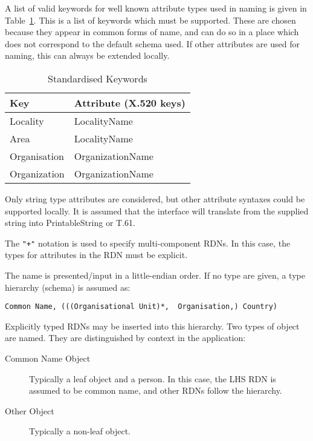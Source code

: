 A list of valid keywords for well known attribute types used in naming is
given in Table~\ref{keywords}.  This is a list of keywords which must be
supported.  These are chosen because they appear in common forms of name,
and can do so in a place which does not correspond to the default schema
used.
If other attributes are used for naming, this can always be
extended locally.

\begin{table}
\begin{center}
\begin {tabular}{l l}
Key & Attribute (X.520 keys) \\
\hline
Locality & LocalityName \\
Area & LocalityName \\
Organisation & OrganizationName \\
Organization & OrganizationName \\
\end {tabular}
\end{center}
\caption {Standardised Keywords}
\label {keywords}
\end{table}


Only string type attributes are
considered, but other attribute syntaxes could be supported locally.
It is assumed that the interface will translate from the supplied string
into PrintableString or T.61.

The \verb|"+"| notation is used to specify multi-component RDNs.  In this
case, the types for attributes in the RDN must be explicit.

The name is presented/input in a little-endian order.  If no type are given,
a type hierarchy (schema) is assumed as:

\begin {verbatim}
Common Name, (((Organisational Unit)*,  Organisation,) Country)
\end{verbatim}

Explicitly typed RDNs may be inserted into this hierarchy.  Two types of
object are named.  They are distinguished by context in the application:

\begin{description}
\item[Common Name Object] Typically a leaf object and a person.  In this
case, the LHS RDN is assumed to be common name, and other RDNs follow the
hierarchy.

\item[Other Object] Typically a non-leaf object.  
\end{description}


